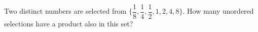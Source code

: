 Two distinct numbers are selected from $\{\dfrac{1}{8},\dfrac{1}{4},\dfrac{1}{2},1,2,4,8\}$. How many unordered selections have a product also in this set?

